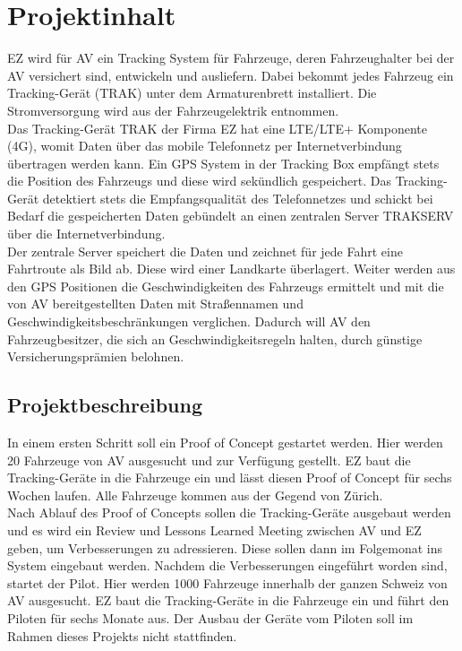 \documentclass[a4paper,10pt]{scrartcl}
\begin{document}
\section{Projektinhalt}
EZ wird für AV ein Tracking System für Fahrzeuge, deren Fahrzeughalter bei der AV versichert sind, entwickeln und ausliefern. Dabei bekommt jedes Fahrzeug ein Tracking-Gerät (\glqq TRAK\grqq{}) unter dem Armaturenbrett installiert. Die Stromversorgung wird aus der Fahrzeugelektrik entnommen. \\
Das Tracking-Gerät \glqq TRAK\grqq{} der Firma EZ hat eine LTE/LTE+ Komponente (4G), womit Daten über das mobile Telefonnetz per Internetverbindung übertragen werden kann. Ein GPS System in der Tracking Box empfängt stets die Position des Fahrzeugs und diese wird sekündlich gespeichert. Das Tracking-Gerät detektiert stets die Empfangsqualität des Telefonnetzes und schickt bei Bedarf die gespeicherten Daten gebündelt an einen zentralen Server  \glqq TRAKSERV\grqq{} über die Internetverbindung. \\
Der zentrale Server speichert die Daten und zeichnet für jede Fahrt eine Fahrtroute als Bild ab. Diese wird einer Landkarte überlagert. Weiter werden aus den GPS Positionen die Geschwindigkeiten des Fahrzeugs ermittelt und mit die von AV bereitgestellten Daten mit Straßennamen und Geschwindigkeitsbeschränkungen verglichen. Dadurch will AV den Fahrzeugbesitzer, die sich an Geschwindigkeitsregeln halten, durch günstige Versicherungsprämien belohnen.


\subsection{Projektbeschreibung}
In einem ersten Schritt soll ein  \glqq Proof of Concept \grqq{} gestartet werden. Hier werden 20 Fahrzeuge von AV ausgesucht und zur Verfügung gestellt. EZ baut die Tracking-Geräte in die Fahrzeuge ein und lässt diesen \glqq Proof of Concept\grqq{} für sechs Wochen laufen. Alle Fahrzeuge kommen aus der Gegend von Zürich. \\
Nach Ablauf des  \glqq Proof of Concepts\grqq{} sollen die Tracking-Geräte ausgebaut werden und es wird ein Review und Lessons Learned Meeting zwischen AV und EZ geben, um Verbesserungen zu adressieren. Diese sollen dann im Folgemonat ins System eingebaut werden.
Nachdem die Verbesserungen eingeführt worden sind, startet der Pilot. Hier werden 1000 Fahrzeuge innerhalb der ganzen Schweiz von AV ausgesucht. EZ baut die Tracking-Geräte in die Fahrzeuge ein und führt den Piloten für sechs Monate aus. Der Ausbau der Geräte vom Piloten soll im Rahmen dieses Projekts nicht stattfinden.
\end{document}

